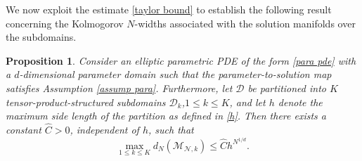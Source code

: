 \documentclass[12pt]{article}
\newtheorem{proposition}{Proposition}[section]
\theoremstyle{remark}
\theoremstyle{definition}
\numberwithin{equation}{section}
\begin{document}
We now exploit the estimate \eqref{taylor bound} to establish the following result concerning the Kolmogorov $N$-widths associated with the solution manifolds over the subdomains.

\begin{proposition} 
    Consider an elliptic parametric PDE of the form \eqref{para pde} with a $d$-dimensional parameter domain such that the parameter-to-solution map satisfies Assumption \ref{assump para}. Furthermore, let $\mathcal{D}$ be partitioned into $K$ tensor-product-structured subdomains ${\mathcal{D}_k}$,$1 \leq k \leq K$, and let $h$ denote the maximum side length of the partition as defined in \eqref{h}. Then there exists a constant $\hat{C} > 0$, independent of $h$, such that
    \begin{equation}
        \max_{1 \leq k \leq K} d_{N}(\mathcal{M}_{\mathcal{N},k}) \leq \hat C h^{N^{1/d}}.
    \label{hat C}
    \end{equation}
\end{proposition}
\end{document}
